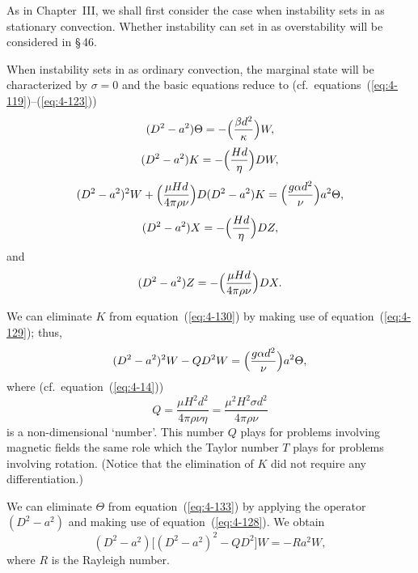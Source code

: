 As in Chapter~III, we shall first consider the case when instability sets in as stationary convection. Whether instability can set in as overstability will be considered in \S\,46.

When instability sets in as ordinary convection, the marginal state will be characterized by $\sigma=0$ and the basic equations reduce to (cf.\ equations~(\ref{eq:4-119})--(\ref{eq:4-123}))
\begin{equation}
\label{eq:4-128}
(D^2-a^2)\Theta = -\Bigl(\frac{\beta d^2}{\kappa}\Bigr)W,
\end{equation}
\begin{equation}
\label{eq:4-129}
(D^2-a^2)K = -\Bigl(\frac{Hd}{\eta}\Bigr)DW,
\end{equation}
\begin{equation}
\label{eq:4-130}
(D^2-a^2)^2 W + \Bigl(\frac{\mu Hd}{4\pi\rho\nu}\Bigr)D(D^2-a^2)K = \Bigl(\frac{g\alpha d^2}{\nu}\Bigr)a^2\Theta,
\end{equation}
\begin{equation}
\label{eq:4-131}
(D^2-a^2)X = -\Bigl(\frac{Hd}{\eta}\Bigr)DZ,
\end{equation}
and
\begin{equation}
\label{eq:4-132}
(D^2-a^2)Z = -\Bigl(\frac{\mu Hd}{4\pi\rho\nu}\Bigr)DX.
\end{equation}

We can eliminate $K$ from equation~(\ref{eq:4-130}) by making use of equation~(\ref{eq:4-129}); thus,
\begin{equation}
\label{eq:4-133}
(D^2-a^2)^2 W - QD^2 W = \Bigl(\frac{g\alpha d^2}{\nu}\Bigr)a^2\Theta,
\end{equation}
where (cf.\ equation~(\ref{eq:4-14}))
\begin{equation}
\label{eq:4-134}
Q = \frac{\mu H^2 d^2}{4\pi\rho\nu\eta} = \frac{\mu^2 H^2\sigma d^2}{4\pi\rho\nu}
\end{equation}
is a non-dimensional `number'. This number $Q$ plays for problems involving magnetic fields the same role which the Taylor number $T$ plays for problems involving rotation. (Notice that the elimination of $K$ did not require any differentiation.)

We can eliminate $\Theta$ from equation~(\ref{eq:4-133}) by applying the operator $(D^2-a^2)$ and making use of equation~(\ref{eq:4-128}). We obtain
\begin{equation}
\label{eq:4-135}
(D^2-a^2)\bigl[(D^2-a^2)^2-QD^2\bigr]W = -Ra^2 W,
\end{equation}
where $R$ is the Rayleigh number.

